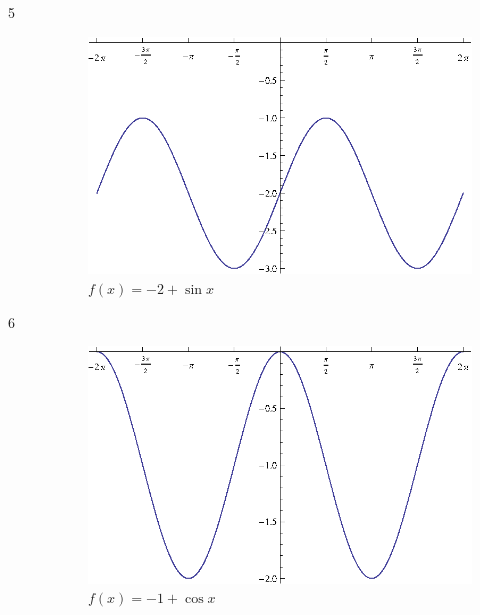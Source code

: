 \documentclass{exam}
\begin{document}
\begin{description}
      \item[5]
        \begin{figure}[H]
          \centering
          \includegraphics[scale=0.8]{exercise05.eps}
          \caption{$f(x) = -2 + \sin x$}
        \end{figure}

      \item[6]
        \begin{figure}[H]
          \centering
          \includegraphics[scale=0.8]{exercise06.eps}
          \caption{$f(x) = -1 + \cos x$}
        \end{figure}


\end{description}
\end{document}

